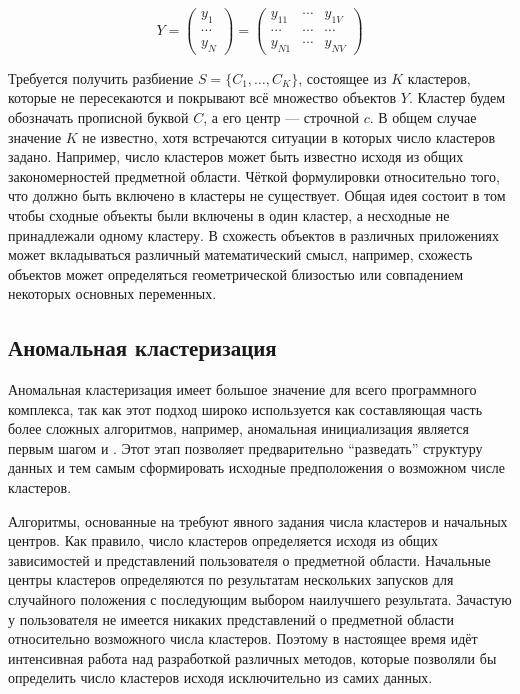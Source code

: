 \documentclass[12pt]{diploma}
\begin{document}
	\begin{equation*}
	Y= \begin{pmatrix} 
	y_{1} \\
	\cdots \\ 
	y_{N} 
	\end{pmatrix}
	= \begin{pmatrix} 
	y_{11} & \cdots  & y_{1V} \\ 
	\cdots & \cdots  & \cdots \\ 
	y_{N1} & \cdots  & y_{NV} 
	\end{pmatrix}
	\end{equation*}
	
	Требуется получить разбиение $ S = \{C_1,\ldots,C_K\} $, состоящее из $ K $ кластеров, которые не пересекаются и покрывают всё множество объектов $ Y $. Кластер будем обозначать прописной буквой $ C $, а его центр --- строчной $ c $. В общем случае значение $ K $ не известно, хотя встречаются ситуации в которых число кластеров задано. Например, число кластеров может быть известно исходя из общих закономерностей предметной области. Чёткой формулировки относительно того, что должно быть включено в кластеры не существует. Общая идея состоит в том чтобы сходные объекты были включены в один кластер, а несходные не принадлежали одному кластеру. В схожесть объектов в различных приложениях может вкладываться различный математический смысл, например, схожесть объектов может определяться геометрической близостью или совпадением некоторых основных переменных.

	\subsection{Аномальная кластеризация} \label{subsec:anomalous}
	Аномальная кластеризация \cite{anomalous-clustring} имеет большое значение для всего программного комплекса, так как этот подход широко используется как составляющая часть более сложных алгоритмов, например, аномальная инициализация является первым шагом \AWard и \AWardpb. Этот этап позволяет предварительно ``разведать'' структуру данных и тем самым сформировать исходные предположения о возможном числе кластеров. 
	
	Алгоритмы, основанные на \kmeans требуют явного задания числа кластеров и начальных центров. Как правило, число кластеров определяется исходя из общих зависимостей и представлений пользователя о предметной области. Начальные центры кластеров определяются по результатам нескольких запусков для случайного положения с последующим выбором наилучшего результата. Зачастую у пользователя не имеется никаких представлений о предметной области относительно возможного числа кластеров. Поэтому в настоящее время идёт интенсивная работа над разработкой различных методов, которые позволяли бы определить число кластеров исходя исключительно из самих данных. 
	
\end{document}
